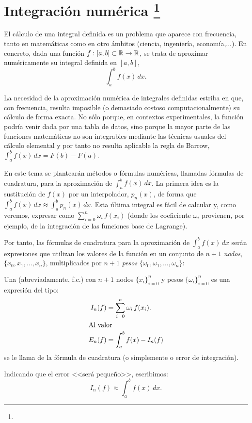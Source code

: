 \chapter[Integración numérica]{Integración numérica%
\footnote{\licenseInfo}}
\label{cha:integracion-numerica}

El cálculo de una integral definida es un problema que aparece con
frecuencia, tanto en matemáticas como en otro ámbitos (ciencia,
ingeniería, economía,...). En concreto, dada una función
$f:[a,b]\subset\operatorname{{\mathbb R}}\to\operatorname{{\mathbb R}}$, se trata de aproximar numéricamente su
integral definida en $[a,b]$,
\begin{equation*}
  \int_a^bf(x)\,dx.
\end{equation*}

La necesidad de la aproximación numérica de integrales definidas
estriba en que, con frecuencia, resulta imposible (o demasiado costoso
computacionalmente) su cálculo de forma exacta. No sólo porque, en
contextos experimentales, la función podría venir dada por una tabla
de datos, sino porque la mayor parte de las funciones matemáticas no
son integrables mediante las técnicas usuales del cálculo elemental
y por tanto no resulta aplicable la regla de Barrow, $\int_a^b f(x)\,
dx=F(b)-F(a)$.

En este tema se plantearán métodos o fórmulas numéricas, llamadas
fórmulas de cuadratura, para la aproximación de $\int_a^b f(x)\,
dx$. La primera idea es la sustitución de $f(x)$ por un interpolador,
$p_n(x)$, de forma que $\int_a^bf(x)\,dx \approx \int_a^b p_n(x)\,
dx$. Esta última integral es fácil de calcular y, como veremos,
expresar como $\sum_{i=0}^n \omega_i \, f(x_i)$ (donde los coeficiente
$\omega_i$ provienen, por ejemplo, de la integración de las
funciones base de Lagrange).


Por tanto, las fórmulas de cuadratura para la aproximación de
$\int_a^b f(x)\, dx$ serán expresiones que utilizan los valores de la
función en un conjunto de $n+1$ \emph{nodos}, $\{x_0,x_1,\dots,x_n\}$,
multiplicados por $n+1$ \emph{pesos}
$\{\omega_0,\omega_1,\dots,\omega_n\}$:
\begin{definition}
  \label{def:formula-cuadratura}
  Una  (abreviadamente, f.c.) con
  $n+1$ nodos $\{x_i\}_{i=0}^n$ y pesos $\{\omega_i\}_{i=0}^n$ es una
  expresión del tipo:
  \begin{align}
    \label{eq:f.cuadratura}
    I_n(f)&=\sum_{i=0}^n \omega_i \, f(x_i).
    \\
    \intertext{Al valor}
    \notag
    E_n(f) &= \int_a^b f(x) - I_n(f) 
  \end{align}
  se le llama  de la fórmula de cuadratura (o
  simplemente  o error de integración). 
\end{definition}
Indicando que el error <<será pequeño>>, escribimos:
\begin{equation*}
  I_n(f) \approx \int_a^b f(x)\, dx.
\end{equation*}

